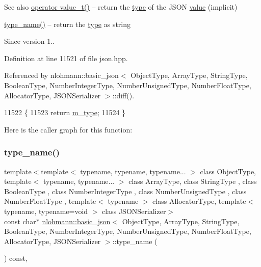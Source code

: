 \begin{DoxySeeAlso}{See also}
\hyperlink{classnlohmann_1_1basic__json_a26ef3058e249f82a04f8ec18f7419027}{operator value\+\_\+t()} -- return the \hyperlink{classnlohmann_1_1basic__json_a2b2d781d7f2a4ee41bc0016e931cadf7}{type} of the J\+S\+ON \hyperlink{classnlohmann_1_1basic__json_adcf8ca5079f5db993820bf50036bf45d}{value} (implicit) 

\hyperlink{classnlohmann_1_1basic__json_a9d0a478571f82f0163b96b2424cd998f}{type\+\_\+name()} -- return the \hyperlink{classnlohmann_1_1basic__json_a2b2d781d7f2a4ee41bc0016e931cadf7}{type} as string
\end{DoxySeeAlso}
\begin{DoxySince}{Since}
version 1.. 
\end{DoxySince}


Definition at line 11521 of file json.\+hpp.



Referenced by nlohmann\+::basic\+\_\+json$<$ Object\+Type, Array\+Type, String\+Type, Boolean\+Type, Number\+Integer\+Type, Number\+Unsigned\+Type, Number\+Float\+Type, Allocator\+Type, J\+S\+O\+N\+Serializer $>$\+::diff().


\begin{DoxyCode}
11522     \{
11523         \textcolor{keywordflow}{return} \hyperlink{classnlohmann_1_1basic__json_a91990b60d7d4d67968a2c1db677536e7}{m\_type};
11524     \}
\end{DoxyCode}
Here is the caller graph for this function\+:
\mbox{\label{classnlohmann_1_1basic__json_a9d0a478571f82f0163b96b2424cd998f}} 
\subsubsection{\texorpdfstring{type\+\_\+name()}{type\_name()}}
{\footnotesize\ttfamily template$<$template$<$ typename, typename, typename... $>$ class Object\+Type, template$<$ typename, typename... $>$ class Array\+Type, class String\+Type , class Boolean\+Type , class Number\+Integer\+Type , class Number\+Unsigned\+Type , class Number\+Float\+Type , template$<$ typename $>$ class Allocator\+Type, template$<$ typename, typename=void $>$ class J\+S\+O\+N\+Serializer$>$ \\
const char$\ast$ \hyperlink{classnlohmann_1_1basic__json}{nlohmann\+::basic\+\_\+json}$<$ Object\+Type, Array\+Type, String\+Type, Boolean\+Type, Number\+Integer\+Type, Number\+Unsigned\+Type, Number\+Float\+Type, Allocator\+Type, J\+S\+O\+N\+Serializer $>$\+::type\+\_\+name (\begin{DoxyParamCaption}{ }\end{DoxyParamCaption}) const\hspace{0.3cm}{\ttfamily [inline]}, {\ttfamily [noexcept]}}



